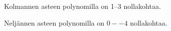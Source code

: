 \begin{esimerkki} Kolmannen asteen polynomilla on 1--3 nollakohtaa.

\begin{lukusuora}{-2.5}{3}{3.6}
\lukusuoraisobbox
{}
\end{lukusuora}
\begin{lukusuora}{-2.8}{2.5}{3.6}
\lukusuoraisobbox
{}
\end{lukusuora}
\begin{lukusuora}{-2}{2}{3.6}
\lukusuoraisobbox
{}
\end{lukusuora}
\end{esimerkki}


\begin{esimerkki} Neljännen asteen polynomilla on $0--4$ nollakohtaa.
\begin{lukusuora}{-4}{4}{3.6}
\end{lukusuora}
\begin{lukusuora}{-4}{4}{3.6}
\end{lukusuora}
\begin{lukusuora}{-4}{4}{3.6}
\end{lukusuora}

\begin{lukusuora}{-4}{4}{3.6}
\end{lukusuora}
\begin{lukusuora}{-2.8}{2.8}{3.6}
\end{lukusuora}
\end{esimerkki}